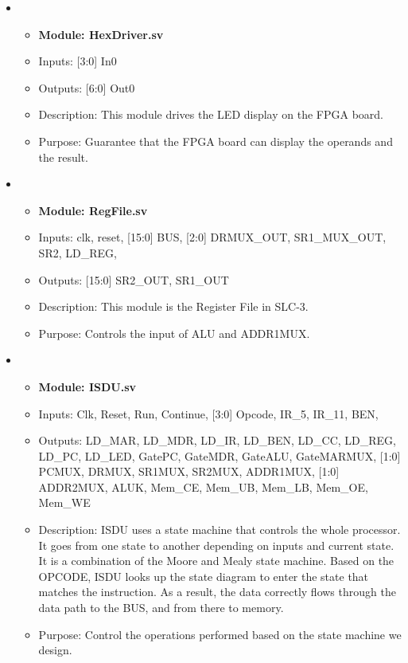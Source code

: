 \documentclass[11pt]{article}
\begin{document}
\begin{itemize}
    \item
    \begin{itemize}
        \item \textbf{Module: HexDriver.sv}
        \item Inputs: [3:0]  In0
        \item Outputs: [6:0]  Out0
        \item Description: This module drives the LED display on the FPGA board.
        \item Purpose: Guarantee that the FPGA board can display the operands and the result.
    \end{itemize}

    \item
    \begin{itemize}
        \item \textbf{Module: RegFile.sv}
        \item Inputs: clk, reset,
        [15:0] BUS,
        [2:0] DRMUX\_OUT, SR1\_MUX\_OUT, SR2,
        LD\_REG, 
        \item Outputs: [15:0] SR2\_OUT, SR1\_OUT
        \item Description: This module is the Register File in SLC-3.
        \item Purpose: Controls the input of ALU and ADDR1MUX.
    \end{itemize}

    \item
    \begin{itemize}
        \item \textbf{Module: ISDU.sv}
        \item Inputs: Clk, 
        Reset,
        Run,
        Continue,
[3:0] Opcode, 
IR\_5,
IR\_11,
BEN,
        \item Outputs: LD\_MAR,
        LD\_MDR,
        LD\_IR,
        LD\_BEN,
        LD\_CC,
        LD\_REG,
        LD\_PC,
        LD\_LED, 
GatePC,
        GateMDR,
        GateALU,
        GateMARMUX,
[1:0]  PCMUX,
DRMUX,
        SR1MUX,
        SR2MUX,
        ADDR1MUX,
[1:0]  ADDR2MUX,
        ALUK,
Mem\_CE,
        Mem\_UB,
        Mem\_LB,
        Mem\_OE,
        Mem\_WE
        \item Description: ISDU uses a state machine that controls the whole processor. It goes from one state to another depending on inputs and current state. It is a combination of the Moore and Mealy state machine. Based on the OPCODE, ISDU looks up the state diagram to enter the state that matches the instruction. As a result, the data correctly flows through the data path to the BUS, and from there to memory.
        \item Purpose: Control the operations performed based on the state machine we design.
    \end{itemize}


\end{itemize}
\end{document}
